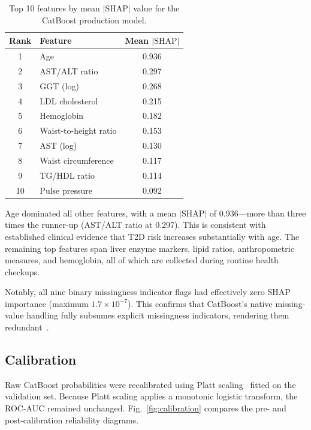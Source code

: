 \begin{table}[ht]
\centering
\caption{Top 10 features by mean $|\text{SHAP}|$ value for the CatBoost production model.}
\label{tab:shap}
\begin{tabular}{clc}
\hline
\textbf{Rank} & \textbf{Feature} & \textbf{Mean $|\text{SHAP}|$} \\
\hline
1  & Age                      & 0.936 \\
2  & AST/ALT ratio            & 0.297 \\
3  & GGT (log)                & 0.268 \\
4  & LDL cholesterol          & 0.215 \\
5  & Hemoglobin               & 0.182 \\
6  & Waist-to-height ratio    & 0.153 \\
7  & AST (log)                & 0.130 \\
8  & Waist circumference      & 0.117 \\
9  & TG/HDL ratio             & 0.114 \\
10 & Pulse pressure           & 0.092 \\
\hline
\end{tabular}
\end{table}

Age dominated all other features, with a mean $|\text{SHAP}|$ of 0.936---more than three times the runner-up (AST/ALT ratio at 0.297). This is consistent with established clinical evidence that T2D risk increases substantially with age. The remaining top features span liver enzyme markers, lipid ratios, anthropometric measures, and hemoglobin, all of which are collected during routine health checkups.

Notably, all nine binary missingness indicator flags had effectively zero SHAP importance (maximum $1.7 \times 10^{-7}$). This confirms that CatBoost's native missing-value handling fully subsumes explicit missingness indicators, rendering them redundant~\cite{Sisk2023imputation}.

\subsection{Calibration}
\label{sec:results-calibration}

Raw CatBoost probabilities were recalibrated using Platt scaling~\cite{Platt1999calibration} fitted on the validation set. Because Platt scaling applies a monotonic logistic transform, the ROC-AUC remained unchanged. Fig.~\ref{fig:calibration} compares the pre- and post-calibration reliability diagrams.

